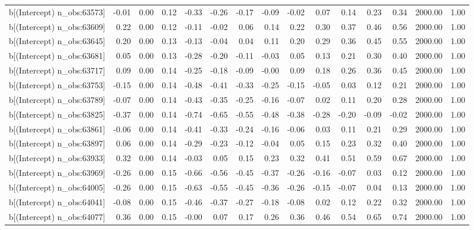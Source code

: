 \begin{table}[ht]
\begin{tabular}{rrrrrrrrrrrrrrr}
  b[(Intercept) n\_obs:63573] & -0.01 & 0.00 & 0.12 & -0.33 & -0.26 & -0.17 & -0.09 & -0.02 & 0.07 & 0.14 & 0.23 & 0.34 & 2000.00 & 1.00 \\ 
  b[(Intercept) n\_obs:63609] & 0.22 & 0.00 & 0.12 & -0.11 & -0.02 & 0.06 & 0.14 & 0.22 & 0.30 & 0.37 & 0.46 & 0.56 & 2000.00 & 1.00 \\ 
  b[(Intercept) n\_obs:63645] & 0.20 & 0.00 & 0.13 & -0.13 & -0.04 & 0.04 & 0.11 & 0.20 & 0.29 & 0.36 & 0.45 & 0.55 & 2000.00 & 1.00 \\ 
  b[(Intercept) n\_obs:63681] & 0.05 & 0.00 & 0.13 & -0.28 & -0.20 & -0.11 & -0.03 & 0.05 & 0.13 & 0.21 & 0.30 & 0.40 & 2000.00 & 1.00 \\ 
  b[(Intercept) n\_obs:63717] & 0.09 & 0.00 & 0.14 & -0.25 & -0.18 & -0.09 & -0.00 & 0.09 & 0.18 & 0.26 & 0.36 & 0.45 & 2000.00 & 1.00 \\ 
  b[(Intercept) n\_obs:63753] & -0.15 & 0.00 & 0.14 & -0.48 & -0.41 & -0.33 & -0.25 & -0.15 & -0.05 & 0.03 & 0.12 & 0.21 & 2000.00 & 1.00 \\ 
  b[(Intercept) n\_obs:63789] & -0.07 & 0.00 & 0.14 & -0.43 & -0.35 & -0.25 & -0.16 & -0.07 & 0.02 & 0.11 & 0.20 & 0.28 & 2000.00 & 1.00 \\ 
  b[(Intercept) n\_obs:63825] & -0.37 & 0.00 & 0.14 & -0.74 & -0.65 & -0.55 & -0.48 & -0.38 & -0.28 & -0.20 & -0.09 & -0.02 & 2000.00 & 1.00 \\ 
  b[(Intercept) n\_obs:63861] & -0.06 & 0.00 & 0.14 & -0.41 & -0.33 & -0.24 & -0.16 & -0.06 & 0.03 & 0.11 & 0.21 & 0.29 & 2000.00 & 1.00 \\ 
  b[(Intercept) n\_obs:63897] & 0.06 & 0.00 & 0.14 & -0.29 & -0.23 & -0.12 & -0.04 & 0.05 & 0.15 & 0.23 & 0.32 & 0.40 & 2000.00 & 1.00 \\ 
  b[(Intercept) n\_obs:63933] & 0.32 & 0.00 & 0.14 & -0.03 & 0.05 & 0.15 & 0.23 & 0.32 & 0.41 & 0.51 & 0.59 & 0.67 & 2000.00 & 1.00 \\ 
  b[(Intercept) n\_obs:63969] & -0.26 & 0.00 & 0.15 & -0.66 & -0.56 & -0.45 & -0.37 & -0.26 & -0.16 & -0.07 & 0.03 & 0.12 & 2000.00 & 1.00 \\ 
  b[(Intercept) n\_obs:64005] & -0.26 & 0.00 & 0.15 & -0.63 & -0.55 & -0.45 & -0.36 & -0.26 & -0.15 & -0.07 & 0.04 & 0.13 & 2000.00 & 1.00 \\ 
  b[(Intercept) n\_obs:64041] & -0.08 & 0.00 & 0.15 & -0.46 & -0.37 & -0.27 & -0.18 & -0.08 & 0.02 & 0.12 & 0.22 & 0.32 & 2000.00 & 1.00 \\ 
  b[(Intercept) n\_obs:64077] & 0.36 & 0.00 & 0.15 & -0.00 & 0.07 & 0.17 & 0.26 & 0.36 & 0.46 & 0.54 & 0.65 & 0.74 & 2000.00 & 1.00 \\ 

\end{tabular}
\end{table}
